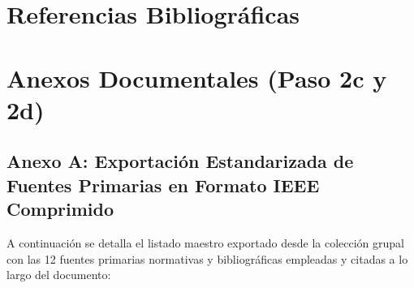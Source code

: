 \documentclass[conference,10pt]{IEEEtran}
\begin{document}
	\section{Referencias Bibliográficas}
	\printbibliography[heading=none]
	\newpage
	\section*{Anexos Documentales (Paso 2c y 2d)}
	\subsection*{Anexo A: Exportación Estandarizada de Fuentes Primarias en Formato IEEE Comprimido}
	A continuación se detalla el listado maestro exportado desde la colección grupal con las 12 fuentes primarias normativas y bibliográficas empleadas y citadas a lo largo del documento:
\end{document}
